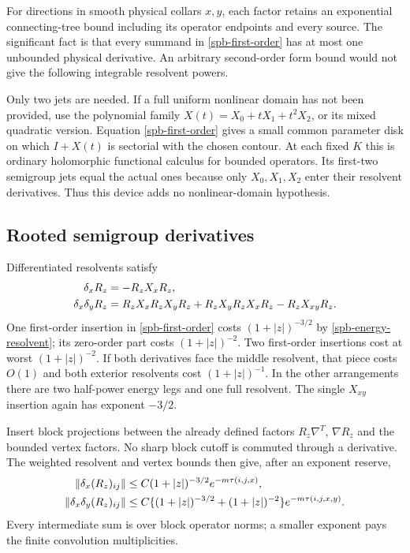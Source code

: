 For directions in smooth physical collars $x,y$, each factor retains
an exponential connecting-tree bound including its operator endpoints
and every source. The significant fact is that every summand in
\eqref{spb-first-order} has at most one unbounded physical derivative.
An arbitrary second-order form bound would not give the following
integrable resolvent powers.

Only two jets are needed. If a full uniform nonlinear domain has not
been provided, use the polynomial family
$X(t)=X_0+tX_1+t^2X_2$, or its mixed quadratic version.
Equation \eqref{spb-first-order} gives a small common parameter disk
on which $I+X(t)$ is sectorial with the chosen contour. At each fixed
$K$ this is ordinary holomorphic functional calculus for bounded
operators. Its first-two semigroup jets equal the actual ones because
only $X_0,X_1,X_2$ enter their resolvent derivatives. Thus this device
adds no nonlinear-domain hypothesis.

\subsection{Rooted semigroup derivatives}
\label{spb-semigroup}

Differentiated resolvents satisfy
\begin{align}
 \delta_xR_z&=-R_zX_xR_z,\notag\\
 \delta_x\delta_yR_z
  &=R_zX_xR_zX_yR_z+R_zX_yR_zX_xR_z-R_zX_{xy}R_z.
 \label{spb-resolvent-derivatives}
\end{align}
One first-order insertion in \eqref{spb-first-order} costs
$(1+|z|)^{-3/2}$ by \eqref{spb-energy-resolvent}; its zero-order
part costs $(1+|z|)^{-2}$. Two first-order insertions cost at worst
$(1+|z|)^{-2}$. If both derivatives face the middle resolvent, that
piece costs $O(1)$ and both exterior resolvents cost
$(1+|z|)^{-1}$. In the other arrangements there are two half-power
energy legs and one full resolvent. The single $X_{xy}$ insertion
again has exponent $-3/2$.

Insert block projections between the already defined factors
$R_z\nabla^T$, $\nabla R_z$ and the bounded vertex factors.
No sharp block cutoff is commuted through a derivative. The weighted
resolvent and vertex bounds then give, after an exponent reserve,
\begin{align}
 \|\delta_x(R_z)_{ij}\|
  &\le C(1+|z|)^{-3/2}e^{-m\tau(i,j,x)},\notag\\
 \|\delta_x\delta_y(R_z)_{ij}\|
  &\le C\{(1+|z|)^{-3/2}+(1+|z|)^{-2}\}
                         e^{-m\tau(i,j,x,y)}.
 \label{spb-rooted-resolvent}
\end{align}
Every intermediate sum is over block operator norms; a smaller
exponent pays the finite convolution multiplicities.

